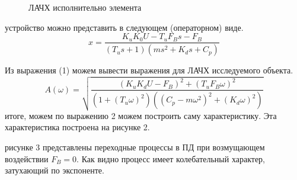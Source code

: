 \documentclass[a4paper, 12pt]{article}
\begin{document}
\hspace*{-\parindent}%
\begin{minipage}{0.4\textwidth}
    \begin{figure}[H]
        \centering
        \caption{ЛАЧХ исполнительно элемента}
    \end{figure}
\end{minipage}
\hspace{0.03\textwidth}
\begin{minipage}{0.57\textwidth}
     устройство можно представить в следующем (операторном) виде.
    \begin{equation}
        x = \frac{K_uK_0U - T_uF_Bs - F_B}{(T_us+1)(ms^2 + K_ds + C_p)}
    \end{equation} 
    \par Из выражения (1) можем вывести выражения для ЛАЧХ исследуемого объекта.
    \begin{equation}
        A(\omega) = \sqrt{\frac{(K_uK_dU - F_B)^2 + (T_uF_B\omega)^2}{(1 + (T_u\omega)^2)((C_p - m\omega^2)^2 + (K_d\omega)^2)}}
    \end{equation}
     итоге, можем по выражению 2 можем построить саму характеристику. Эта характеристика построена на рисунке 2.
\end{minipage}
\vspace{0.5cm}
 рисунке 3 представлены переходные процессы в ПД при возмущающем воздействии $F_B = 0$. Как видно процесс имеет колебательный характер, затухающий по экспоненте.
\end{document}
